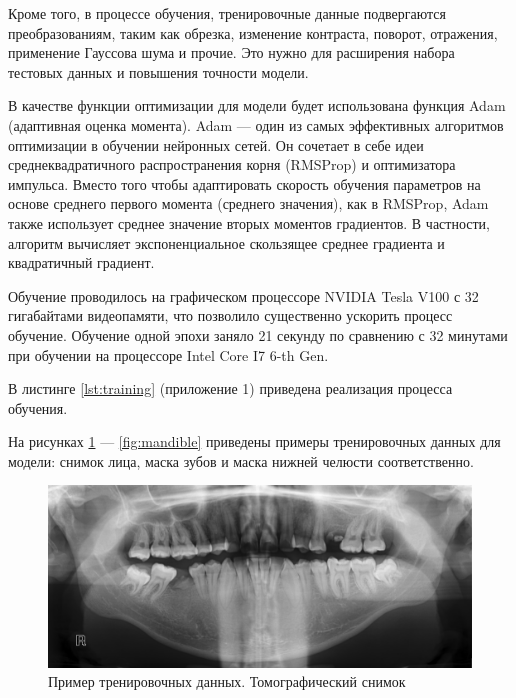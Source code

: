 Кроме того, в процессе обучения, тренировочные данные подвергаются преобразованиям, таким как обрезка, изменение контраста, поворот, отражения, применение Гауссова шума и прочие. Это нужно для расширения набора тестовых данных и повышения точности модели.

В качестве функции оптимизации для модели будет использована функция Adam (адаптивная оценка момента). Adam --- один из самых эффективных алгоритмов оптимизации в обучении нейронных сетей. Он сочетает в себе идеи среднеквадратичного распространения корня (RMSProp) и оптимизатора импульса. Вместо того чтобы адаптировать скорость обучения параметров на основе среднего первого момента (среднего значения), как в RMSProp, Adam также использует среднее значение вторых моментов градиентов. В частности, алгоритм вычисляет экспоненциальное скользящее среднее градиента и квадратичный градиент.

Обучение проводилось на графическом процессоре NVIDIA Tesla V100 с 32 гигабайтами видеопамяти, что позволило существенно ускорить процесс обучение. Обучение одной эпохи заняло 21 секунду по сравнению с 32 минутами при обучении на процессоре Intel Core I7 6-th Gen.

В листинге \ref{lst:training} (приложение 1)  приведена реализация процесса обучения.

На рисунках \ref{fig:scan} --- \ref{fig:mandible} приведены примеры тренировочных данных для модели: снимок лица, маска зубов и маска нижней челюсти соответственно.

\begin{figure}[H]
	\centering
	\includegraphics[width=\textwidth]{img/scan.png}
	\caption{Пример тренировочных данных. Томографический снимок}
	\label{fig:scan}
\end{figure}

